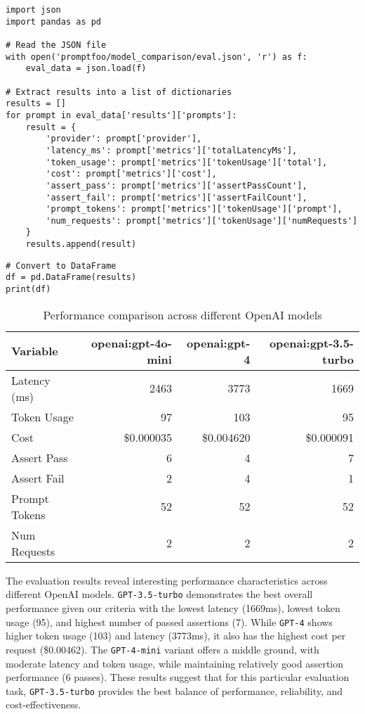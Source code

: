 \begin{verbatim}
import json
import pandas as pd

# Read the JSON file
with open('promptfoo/model_comparison/eval.json', 'r') as f:
    eval_data = json.load(f)

# Extract results into a list of dictionaries
results = []
for prompt in eval_data['results']['prompts']:
    result = {
        'provider': prompt['provider'],
        'latency_ms': prompt['metrics']['totalLatencyMs'],
        'token_usage': prompt['metrics']['tokenUsage']['total'],
        'cost': prompt['metrics']['cost'],
        'assert_pass': prompt['metrics']['assertPassCount'], 
        'assert_fail': prompt['metrics']['assertFailCount'],
        'prompt_tokens': prompt['metrics']['tokenUsage']['prompt'],
        'num_requests': prompt['metrics']['tokenUsage']['numRequests']
    }
    results.append(result)
\end{verbatim}


\begin{verbatim}
# Convert to DataFrame
df = pd.DataFrame(results)
print(df)
\end{verbatim}

\begin{table}[h]
\centering
\begin{tabular}{|l|r|r|r|}
\hline
Variable & openai:gpt-4o-mini & openai:gpt-4 & openai:gpt-3.5-turbo \\
\hline
Latency (ms) & 2463 & 3773 & 1669 \\
Token Usage & 97 & 103 & 95 \\
Cost & \$0.000035 & \$0.004620 & \$0.000091 \\
Assert Pass & 6 & 4 & 7 \\
Assert Fail & 2 & 4 & 1 \\
Prompt Tokens & 52 & 52 & 52 \\
Num Requests & 2 & 2 & 2 \\
\hline
\end{tabular}
\caption{Performance comparison across different OpenAI models}
\label{tab:model-comparison}
\end{table}
The evaluation results reveal interesting performance characteristics across different OpenAI models. \texttt{GPT-3.5-turbo} demonstrates the best overall performance given our criteria with the lowest latency (1669ms), lowest token usage (95), and highest number of passed assertions (7). While \texttt{GPT-4} shows higher token usage (103) and latency (3773ms), it also has the highest cost per request (\$0.00462). The \texttt{GPT-4-mini} variant offers a middle ground, with moderate latency and token usage, while maintaining relatively good assertion performance (6 passes). These results suggest that for this particular evaluation task, \texttt{GPT-3.5-turbo} provides the best balance of performance, reliability, and cost-effectiveness.

